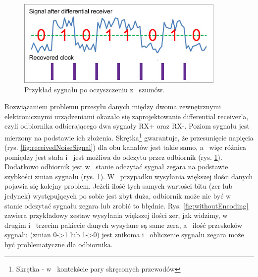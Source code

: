 \documentclass{BscUS}
\begin{document}
\begin{figure}[H]
\centering
\includegraphics[width=0.9\textwidth]{./img/receivedCleanedSignal}
\caption{Przykład sygnału po oczyszczeniu z~ szumów. \cite{receivedCleanedSignal}}
\label{fig:receivedCleanedSignal}
\end{figure}
\noindent Rozwiązaniem problemu przesyłu danych między dwoma zewnętrznymi elektronicznymi urządzeniami okazało się zaprojektowanie differential receiver'a, czyli odbiornika odbierającego dwa sygnały RX+ oraz RX-. Poziom sygnału jest mierzony na podstawie ich złożenia. Skrętka\footnote{Skrętka - w~ kontekście pary skręconych przewodów} gwarantuje, że przesunięcie napięcia (rys. \ref{fig:receivedNoiseSignal}) dla obu kanałów jest takie samo, a~ więc różnica pomiędzy jest stała i~ jest możliwa do odczytu przez odbiornik (rys. \ref{fig:receivedCleanedSignal}). Dodatkowo odbiornik jest w~ stanie odczytać sygnał zegara na podstawie szybkości zmian sygnału (rys. \ref{fig:receivedCleanedSignal}).
\newline
\indent W~ przypadku wysyłania większej ilości danych pojawia się kolejny problem. Jeżeli ilość tych samych wartości bitu (zer lub jedynek) występujących po sobie jest zbyt duża, odbiornik może nie być w~ stanie odczytać sygnału zegara lub zrobić to błędnie. Rys. \ref{fig:withoutEncoding} zawiera przykładowy zestaw wysyłania większej ilości zer, jak widzimy, w~ drugim i~ trzecim pakiecie danych wysyłane są same zera, a~ ilość przeskoków sygnału (zmian 0->1 lub 1->0) jest znikoma i~ obliczenie sygnału zegara może być problematyczne dla odbiornika.
\end{document}
